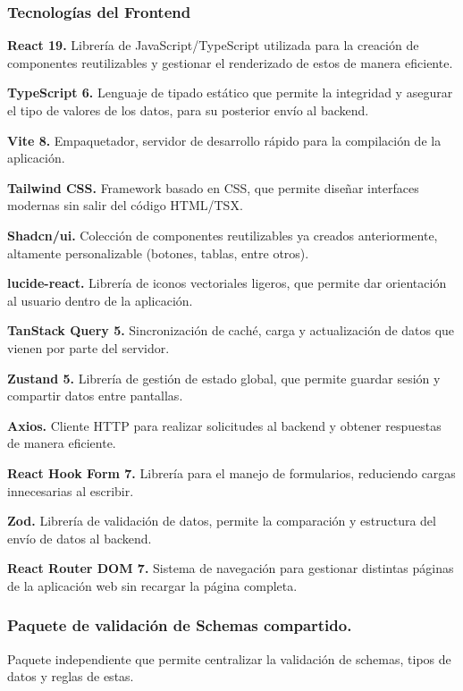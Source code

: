 \subsubsection{Tecnologías del Frontend}
\textbf{React 19.} Librería de JavaScript/TypeScript utilizada para la creación de componentes reutilizables y gestionar el renderizado de estos de manera eficiente.\par
\textbf{TypeScript 6.} Lenguaje de tipado estático que permite la integridad y asegurar el tipo de valores de los datos, para su posterior envío al backend.\par
\textbf{Vite 8.} Empaquetador, servidor de desarrollo rápido para la compilación de la aplicación.\par
\textbf{Tailwind CSS.} Framework basado en CSS, que permite diseñar interfaces modernas sin salir del código HTML/TSX.\par
\textbf{Shadcn/ui.} Colección de componentes reutilizables ya creados anteriormente, altamente personalizable (botones, tablas, entre otros).\par
\textbf{lucide-react.} Librería de iconos vectoriales ligeros, que permite dar orientación al usuario dentro de la aplicación.\par
\textbf{TanStack Query 5.} Sincronización de caché, carga y actualización de datos que vienen por parte del servidor.\par
\textbf{Zustand 5.} Librería de gestión de estado global, que permite guardar sesión y compartir datos entre pantallas.\par
\textbf{Axios.} Cliente HTTP para realizar solicitudes al backend y obtener respuestas de manera eficiente.\par
\textbf{React Hook Form 7.} Librería para el manejo de formularios, reduciendo cargas innecesarias al escribir.\par
\textbf{Zod.} Librería de validación de datos, permite la comparación y estructura del envío de datos al backend.\par
\textbf{React Router DOM 7.} Sistema de navegación para gestionar distintas páginas de la aplicación web sin recargar la página completa.\par
\subsubsection{Paquete de validación de Schemas compartido.} 
Paquete independiente que permite centralizar la validación de schemas, tipos de datos y reglas de estas. \par

